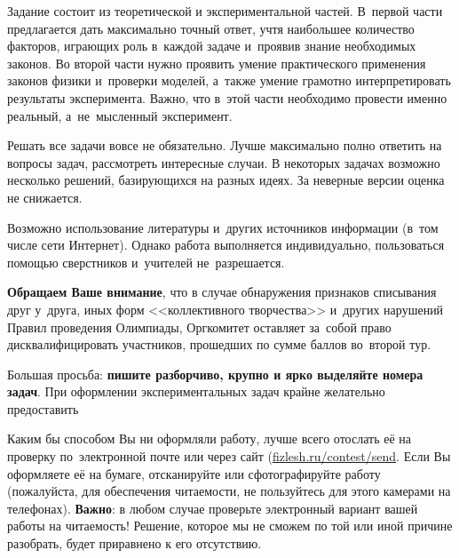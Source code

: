 \documentclass[a4paper,12pt]{article}
\begin{document}
Задание состоит из теоретической и экспериментальной частей. В~первой части предлагается
дать максимально точный ответ, учтя наибольшее количество факторов, играющих роль в~каждой
задаче и~проявив знание необходимых законов. Во второй части нужно проявить умение практического
применения законов физики и~проверки моделей, а~также умение грамотно интерпретировать результаты
эксперимента. Важно, что в~этой части необходимо провести именно реальный, а~не~мысленный эксперимент.

\bigskip

Решать все задачи вовсе не обязательно. Лучше максимально полно ответить на вопросы задач,
рассмотреть интересные случаи. В некоторых задачах возможно несколько решений, базирующихся
на разных идеях. За неверные версии оценка не снижается.


\bigskip

Возможно использование литературы и~других источников информации (в~том числе сети Интернет).
Однако работа выполняется индивидуально, пользоваться помощью сверстников и~учителей не~разрешается.

\textbf{Обращаем Ваше внимание}, что в случае обнаружения признаков списывания друг у~друга,
иных форм <<коллективного творчества>> и~других нарушений Правил проведения Олимпиады,
Оргкомитет оставляет за~собой право дисквалифицировать участников, прошедших по сумме баллов
во~второй тур.


\bigskip


Большая просьба: \textbf{пишите разборчиво, крупно и ярко выделяйте номера задач}.
При оформлении экспериментальных задач крайне желательно предоставить

Каким бы способом Вы ни оформляли работу, лучше всего отослать её на проверку по~электронной
почте \href{mailto:\olympmail}{\olympmail}
или через сайт (\href{http://fizlesh.ru/contest/send}{fizlesh.ru/contest/send}.
Если Вы оформляете её на бумаге, отсканируйте или сфотографируйте работу
(пожалуйста, для обеспечения читаемости, не пользуйтесь для этого камерами на телефонах).
\textbf{Важно}: в любом случае проверьте электронный вариант вашей работы на читаемость!
Решение, которое мы не сможем по той или иной причине разобрать, будет приравнено к его отсутствию.
\end{document}
